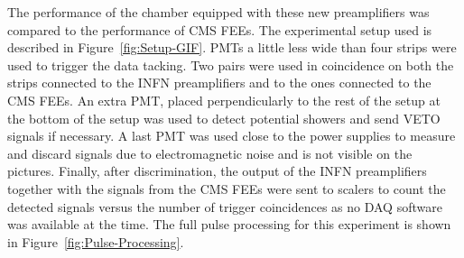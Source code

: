 \endgroup
	
	The performance of the chamber equipped with these new preamplifiers was compared to the performance of CMS FEEs. The experimental setup used is described in Figure~\ref{fig:Setup-GIF}. PMTs a little less wide than four strips were used to trigger the data tacking. Two pairs were used in coincidence on both the strips connected to the INFN preamplifiers and to the ones connected to the CMS FEEs. An extra PMT, placed perpendicularly to the rest of the setup at the bottom of the setup was used to detect potential showers and send VETO signals if necessary. A last PMT was used close to the power supplies to measure and discard signals due to electromagnetic noise and is not visible on the pictures. Finally, after discrimination, the output of the INFN preamplifiers together with the signals from the CMS FEEs were sent to scalers to count the detected signals versus the number of trigger coincidences as no DAQ software was available at the time. The full pulse processing for this experiment is shown in Figure~\ref{fig:Pulse-Processing}.
	 

